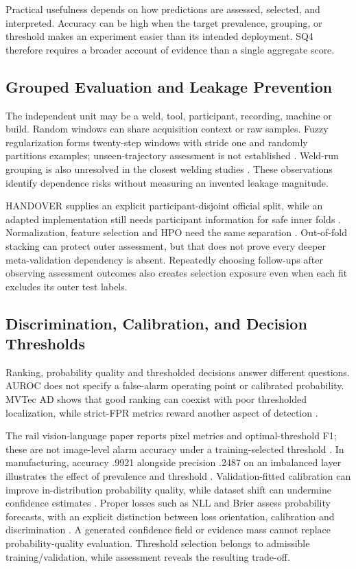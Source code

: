Practical usefulness depends on how predictions are assessed, selected, and interpreted. Accuracy can be high when the target prevalence, grouping, or threshold makes an experiment easier than its intended deployment. SQ4 therefore requires a broader account of evidence than a single aggregate score.

\subsection{Grouped Evaluation and Leakage Prevention}
The independent unit may be a weld, tool, participant, recording, machine or build. Random windows can share acquisition context or raw samples. Fuzzy regularization forms twenty-step windows with stride one and randomly partitions examples; unseen-trajectory assessment is not established \citep[PDF pp.~4--5]{Altinses2023Fuzzy}. Weld-run grouping is also unresolved in the closest welding studies \citep{P003,Hua2026Weld}. These observations identify dependence risks without measuring an invented leakage magnitude.

HANDOVER supplies an explicit participant-disjoint official split, while an adapted implementation still needs participant information for safe inner folds \citep{Thoduka2024Handover}. Normalization, feature selection and HPO need the same separation \citep{P004,P017}. Out-of-fold stacking can protect outer assessment, but that does not prove every deeper meta-validation dependency is absent. Repeatedly choosing follow-ups after observing assessment outcomes also creates selection exposure even when each fit excludes its outer test labels.

\subsection{Discrimination, Calibration, and Decision Thresholds}
Ranking, probability quality and thresholded decisions answer different questions. AUROC does not specify a false-alarm operating point or calibrated probability. MVTec AD shows that good ranking can coexist with poor thresholded localization, while strict-FPR metrics reward another aspect of detection \citep{Bergmann2019MVTec,Costanzino2024Multimodal,Cheng2025Multimodal}.

The rail vision-language paper reports pixel metrics and optimal-threshold F1; these are not image-level alarm accuracy under a training-selected threshold \citep[PDF p.~7]{P031}. In manufacturing, accuracy .9921 alongside precision .2487 on an imbalanced layer illustrates the effect of prevalence and threshold \citep{Petrich2021Multimodal}. Validation-fitted calibration can improve in-distribution probability quality, while dataset shift can undermine confidence estimates \citep{Guo2017Calibration,P008}. Proper losses such as NLL and Brier assess probability forecasts, with an explicit distinction between loss orientation, calibration and discrimination \citep{P055}. A generated confidence field or evidence mass cannot replace probability-quality evaluation. Threshold selection belongs to admissible training/validation, while assessment reveals the resulting trade-off.

